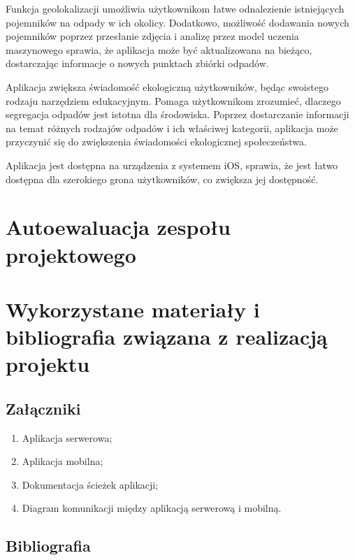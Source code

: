 \documentclass[12pt, a4paper, twoside, openany]{book}
\begin{document}
Funkcja geolokalizacji umożliwia użytkownikom łatwe odnalezienie istniejących pojemników na odpady w ich okolicy.
Dodatkowo, możliwość dodawania nowych pojemników poprzez przesłanie zdjęcia i analizę przez model uczenia maszynowego sprawia, że aplikacja może być aktualizowana na bieżąco, dostarczając informacje o nowych punktach zbiórki odpadów.

Aplikacja zwiększa świadomość ekologiczną użytkowników, będąc swoistego rodzaju narzędziem edukacyjnym. Pomaga użytkownikom zrozumieć, dlaczego segregacja odpadów jest istotna dla środowiska.
Poprzez dostarczanie informacji na temat różnych rodzajów odpadów i ich właściwej kategorii, aplikacja może przyczynić się do zwiększenia świadomości ekologicznej społeczeństwa.

Aplikacja jest dostępna na urządzenia z systemem iOS, sprawia, że jest łatwo dostępna dla szerokiego grona użytkowników, co zwiększa jej dostępność.

\section{Autoewaluacja zespołu projektowego}

\section{Wykorzystane materiały i bibliografia związana z realizacją projektu}

\subsection{Załączniki}

\begin{enumerate}
    \item Aplikacja serwerowa;
    \item Aplikacja mobilna;
    \item Dokumentacja ścieżek aplikacji;
    \item Diagram komunikacji między aplikacją serwerową i mobilną.
\end{enumerate}

\subsection{Bibliografia}
\end{document}
